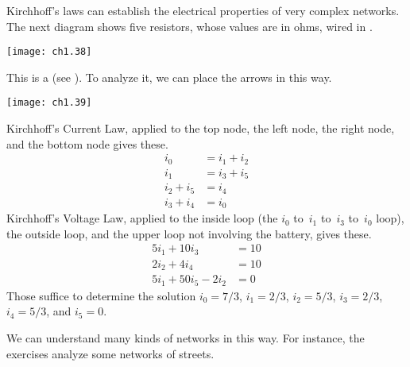 Kirchhoff's laws can 
establish the electrical properties of very complex networks.
The next diagram shows
five resistors, whose values are in ohms, wired in 
. 
\begin{center}
  \texttt{[image: ch1.38]}
\end{center}
This is a  
(see ).
To analyze it, we can place the arrows in this way.
\begin{center}
  \texttt{[image: ch1.39]}
\end{center}
Kirchhoff's Current Law, applied to the
top node, the left node, the right node, and the bottom node gives
these.
\begin{align*}
   i_0     &=  i_1+i_2  \\
   i_1     &=  i_3+i_5  \\
   i_2+i_5 &=  i_4      \\
   i_3+i_4 &=  i_0
\end{align*} 
Kirchhoff's Voltage Law,
applied to the inside loop (the $i_0$ to~$i_1$ to~$i_3$ to~$i_0$ loop), 
the outside loop, 
and the upper loop not involving the battery, gives these.  
\begin{align*}
      5i_1+10i_3  &= 10   \\
      2i_2+4i_4   &= 10   \\
      5i_1+50i_5-2i_2  &= 0     
\end{align*} 
Those suffice to determine the solution 
$i_0=7/3$, $i_1=2/3$, $i_2=5/3$, 
$i_3=2/3$, $i_4=5/3$, and $i_5=0$. 

We can understand many kinds of networks in this way.
For instance, the exercises analyze some networks of streets.
 
